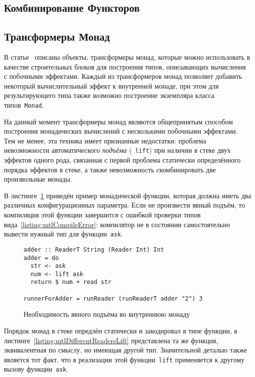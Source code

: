 \subsection{Комбинирование Функторов}

\subsection{Трансформеры Монад}

В статье~\autocite{MonadTransformers} описаны объекты, трансформеры монад, которые можно использовать в качестве строительных блоков для построения типов, описывающих вычисления с побочными эффектами. Каждый из трансформеров монад позволяет добавить некоторый вычислительный эффект к внутренней монаде, при этом для результирующего типа также возможно построение экземпляра класса типов~\lstinline{Monad}.

На данный момент трансформеры монад являются общепринятым способом построения монадических вычислений с несколькими побочными эффектами. Тем не менее, эта техника имеет признанные недостатки: проблема невозможности автоматического \emph{подъёма} (~\lstinline{lift}) при наличии в стеке двух эффектов одного рода, связанная с первой проблема статически определённого порядка эффектов в стеке, а также невозможность скомбинировать две произвольные монады. 

В листинге~\ref{listing:mtlReadersLift} приведён пример монадической функции, которая должна иметь два различных конфигурационных параметра. Если не произвести явный подъём, то компиляция этой функции завершится с ошибкой проверки типов вида~\ref{listing:mtlCompileError}: компилятор не в состоянии самостоятельно вывести нужный тип для функции~\lstinline{ask}.

\begin{figure}[t]
\begin{lstlisting}
adder :: ReaderT String (Reader Int) Int
adder = do
  str <- ask
  num <- lift ask
  return $ num + read str

runnerForAdder = runReader (runReaderT adder "2") 3
\end{lstlisting}
\caption{Необходимость явного подъёма во внутреннюю монаду}
\label{listing:mtlReadersLift}
\end{figure}

Порядок монад в стеке опредлён статически и закодировал в типе функции, в листинге~\ref{listing:mtlDifferentReadersLift} представлена та же функция, эквивалентная по смыслу, но имеющая другой тип. Значительной деталью также является тот факт, что в реализации этой функции~\lstinline{lift} применяется к другому вызову функции~\lstinline{ask}. 

